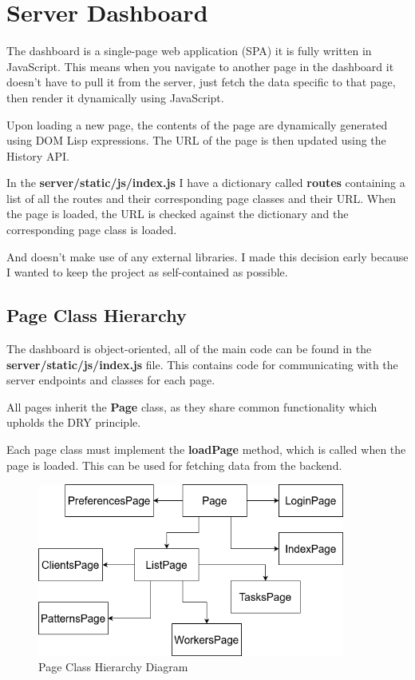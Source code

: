 \section{Server Dashboard}
The dashboard is a single-page web application (SPA) it is fully written in JavaScript.
This means when you navigate to another page in the dashboard it doesn't have to pull it from the server, just fetch the data specific to that page, then render it dynamically using JavaScript.

Upon loading a new page, the contents of the page are dynamically generated using DOM Lisp expressions.
The URL of the page is then updated using the History API.

In the \textbf{server/static/js/index.js} I have a dictionary called \textbf{routes} containing a list of all the routes and their corresponding page classes and their URL.
When the page is loaded, the URL is checked against the dictionary and the corresponding page class is loaded.

And doesn't make use of any external libraries.
I made this decision early because I wanted to keep the project as self-contained as possible.

\subsection {Page Class Hierarchy}

The dashboard is object-oriented, all of the main code can be found in the \textbf{server/static/js/index.js} file.
This contains code for communicating with the server endpoints and classes for each page.

All pages inherit the \textbf{Page} class, as they share common functionality which upholds the DRY principle.


Each page class must implement the \textbf{loadPage} method, which is called when the page is loaded.
This can be used for fetching data from the backend.

\begin{figure}[h!]
    \includegraphics[width=0.9\textwidth]{images/dashboard_hierarchy.drawio}
    \caption{Page Class Hierarchy Diagram}
    \label{image:sysArchitecture}
\end{figure}

